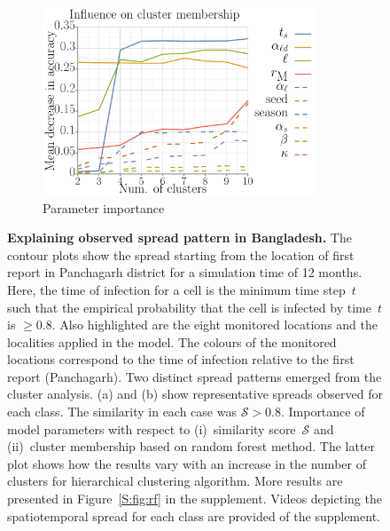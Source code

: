 \documentclass[11pt]{article}
\newcommand{\similarity}{\mathcal{S}}
\theoremstyle{definition}
\begin{document}
\begin{figure}[t]
\begin{subfigure}[b]{.32\textwidth}
    \includegraphics[width=0.9\textwidth]{../../clustering/results/agglomerative/rf_k_agglomerative_mse.pdf}
    \caption{Parameter importance \label{fig:rf}}
\end{subfigure}
\caption{\textbf{Explaining observed spread pattern in Bangladesh.} The
contour plots show the spread starting from the location of first report in
Panchagarh district for a simulation time of 12 months.  Here, the time of
infection for a cell is the minimum time step~$t$ such that the empirical
probability that the cell is infected by time~$t$ is $\ge0.8$. Also
highlighted are the eight monitored locations and the localities applied in
the model. The colours of the monitored locations correspond to the time of
infection relative to the first report (Panchagarh). Two distinct spread
patterns emerged from the cluster analysis. (a) and (b) show representative
spreads observed for each class. The similarity in each case was
$\similarity>0.8$.  Importance of model parameters with respect to
(i)~similarity score~$\similarity$ and (ii)~cluster membership based on
random forest method. The latter plot shows how the results vary with an
increase in the number of clusters for hierarchical clustering algorithm.
More results are presented in Figure~\ref{S:fig:rf} in the supplement.
Videos depicting the spatiotemporal spread for each class are provided of
the supplement.
}
\end{figure}
\end{document}
